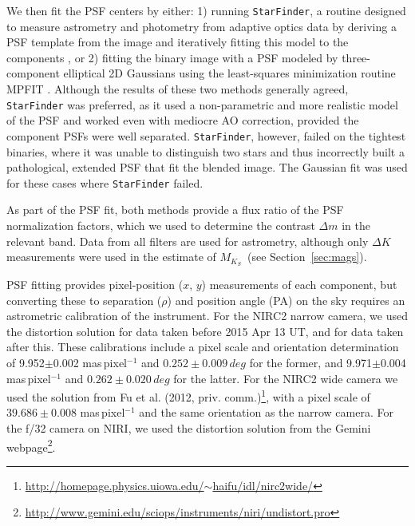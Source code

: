 \documentclass[twocolumn]{aastex62}
\newcommand{\mks}{$M_{K_S}$}
\begin{document}
We then fit the PSF centers by either: 1) running {\tt StarFinder}, a routine designed to measure astrometry and photometry from adaptive optics data by deriving a PSF template from the image and iteratively fitting this model to the components \citep[for more details, see][]{2000A&AS..147..335D}, or 2) fitting the binary image with a PSF modeled by three-component elliptical 2D Gaussians using the least-squares minimization routine MPFIT \citep{Markwart2009}. Although the results of these two methods generally agreed, {\tt StarFinder} was preferred, as it used a non-parametric and more realistic model of the PSF and worked even with mediocre AO correction, provided the component PSFs were well separated. {\tt StarFinder}, however, failed on the tightest binaries, where it was unable to distinguish two stars and thus incorrectly built a pathological, extended PSF that fit the blended image. The Gaussian fit was used for these cases where {\tt StarFinder} failed. 

As part of the PSF fit, both methods provide a flux ratio of the PSF normalization factors, which we used to determine the contrast $\Delta m$ in the relevant band. Data from all filters are used for astrometry, although only $\Delta K$ measurements were used in the estimate of \mks\ (see Section~\ref{sec:mags}).

PSF fitting provides pixel-position ($x$, $y$) measurements of each component, but converting these to separation ($\rho$) and position angle (PA) on the sky requires an astrometric calibration of the instrument. For the NIRC2 narrow camera, we used the \citet{Yelda2010} distortion solution for data taken before 2015 Apr 13 UT, and \citet{2016PASP..128i5004S} for data taken after this. These calibrations include a pixel scale and orientation determination of 9.952$\pm$0.002 mas\,pixel$^{-1}$ and $0.252\pm0.009\,deg$ for the former, and 9.971$\pm$0.004 mas\,pixel$^{-1}$ and $0.262\pm0.020\,deg$ for the latter. For the NIRC2 wide camera we used the solution from Fu et al. (2012, priv. comm.)\footnote{\href{http://homepage.physics.uiowa.edu/~haifu/idl/nirc2wide/}{http://homepage.physics.uiowa.edu/$\sim$haifu/idl/nirc2wide/}}, with a pixel scale of $39.686\pm0.008$ mas\,pixel$^{-1}$ and the same orientation as the narrow camera. For the f/32 camera on NIRI, we used the distortion solution from the Gemini webpage\footnote{\href{http://www.gemini.edu/sciops/instruments/niri/undistort.pro}{http://www.gemini.edu/sciops/instruments/niri/undistort.pro}}. 
\end{document}
